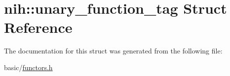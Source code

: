 \hypertarget{structnih_1_1unary__function__tag}{
\section{nih\-:\-:unary\-\_\-function\-\_\-tag \-Struct \-Reference}
\label{structnih_1_1unary__function__tag}
}


\-The documentation for this struct was generated from the following file\-:\begin{DoxyCompactItemize}
\item 
basic/\hyperlink{functors_8h}{functors.\-h}\end{DoxyCompactItemize}

